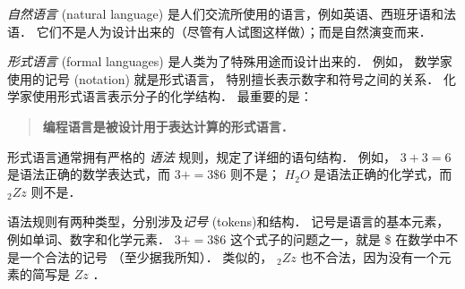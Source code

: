 {\em 自然语言} (natural language) 是人们交流所使用的语言，例如英语、西班牙语和法语． 它们不是人为设计出来的（尽管有人试图这样做）；而是自然演变而来．


{\em 形式语言} (formal languages) 是人类为了特殊用途而设计出来的．  例如， 数学家使用的记号 (notation) 就是形式语言， 特别擅长表示数字和符号之间的关系．  化学家使用形式语言表示分子的化学结构．  最重要的是：


\begin{quote}
\textbf{编程语言是被设计用于表达计算的形式语言． }
\end{quote}


形式语言通常拥有严格的 {\em 语法} 规则，规定了详细的语句结构． 例如， $3 + 3 = 6$ 是语法正确的数学表达式，而 $3 + = 3 \$ 6$ 则不是； $H_2O$ 是语法正确的化学式，而 $_2Zz$ 则不是．
  


语法规则有两种类型，分别涉及{\em 记号} (tokens)和结构．   记号是语言的基本元素，例如单词、数字和化学元素．   $3 + = 3 \$ 6$ 这个式子的问题之一，就是 \$ 在数学中不是一个合法的记号 （至少据我所知）． 类似的， $_2Zz$ 也不合法，因为没有一个元素的简写是  $Zz$ ．
  

